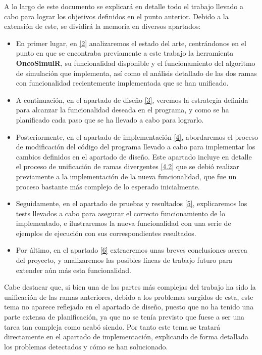 A lo largo de este documento se explicará en detalle todo el trabajo llevado a cabo para lograr los objetivos definidos en el punto anterior. Debido a la extensión de este, se dividirá la memoria en diversos apartados:
\begin{itemize}
	\item En primer lugar, en \ref{2} analizaremos el estado del arte, centrándonos en el punto en que se encontraba previamente a este trabajo la herramienta \textbf{OncoSimulR}\cite{OncoSimulR}, su funcionalidad disponible y el funcionamiento del algoritmo de simulación que implementa, así como el análisis detallado de las dos ramas con funcionalidad recientemente implementada que se han unificado.
	\item A continuación, en el apartado de diseño \ref{3}, veremos la estrategia definida para alcanzar la funcionalidad deseada en el programa, y como se ha planificado cada paso que se ha llevado a cabo para lograrlo.
	\item Posteriormente, en el apartado de implementación \ref{4}, abordaremos el proceso de modificación del código del programa llevado a cabo para implementar los cambios definidos en el apartado de diseño. Este apartado incluye en detalle el proceso de unificación de ramas divergentes \ref{4.2} que se debió realizar previamente a la implementación de la nueva funcionalidad, que fue un proceso bastante más complejo de lo esperado inicialmente.
	\item Seguidamente, en el apartado de pruebas y resultados \ref{5}, explicaremos los tests llevados a cabo para asegurar el correcto funcionamiento de lo implementado, e ilustraremos la nueva funcionalidad con una serie de ejemplos de ejecución con sus correspondientes resultados.
	\item Por último, en el apartado \ref{6} extraeremos unas breves conclusiones acerca del proyecto, y analizaremos las posibles líneas de trabajo futuro para extender aún más esta funcionalidad.
\end{itemize}

Cabe destacar que, si bien una de las partes más complejas del trabajo ha sido la unificación de las ramas anteriores, debido a los problemas surgidos de esta, este tema no aparece reflejado en el apartado de diseño, puesto que no ha tenido una parte extensa de planificación, ya que no se tenía previsto que fuese a ser una tarea tan compleja como acabó siendo. Por tanto este tema se tratará directamente en el apartado de implementación, explicando de forma detallada los problemas detectados y cómo se han solucionado.